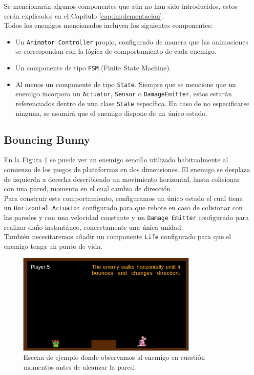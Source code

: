 Se mencionarán algunos componentes que aún no han sido introducidos, estos serán explicados en el Capítulo \ref{cap:implementacion}.\\


Todos los enemigos mencionados incluyen los siguientes componentes:

\begin{itemize}
\item Un \texttt{Animator Controller} propio, configurado de manera que las animaciones se correspondan con la lógica de comportamiento de cada enemigo.
\item Un componente de tipo \texttt{FSM} (Finite State Machine).
\item Al menos un componente de tipo \texttt{State}. Siempre que se mencione que un enemigo incorpora un \texttt{Actuator}, \texttt{Sensor} o \texttt{DamageEmitter}, estos estarán referenciados dentro de una clase \texttt{State} específica. En caso de no especificarse ninguna, se asumirá que el enemigo dispone de un único estado.
\end{itemize}

\subsection{Bouncing Bunny}

En la Figura \ref{fig:BouncingBunny} se puede ver un enemigo sencillo utilizado habitualmente al comienzo de los juegos de plataformas en dos dimensiones. El enemigo se desplaza de izquierda a derecha describiendo un movimiento horizontal, hasta colisionar con una pared, momento en el cual cambia de dirección.\\

Para construir este comportamiento, configuramos un único estado el cual tiene un \texttt{Horizontal Actuator} configurado para que rebote en caso de colisionar con las paredes y con una velocidad constante y un \texttt{Damage Emitter} configurado para realizar daño instantáneo, concretamente una única unidad.\\

También necesitaremos añadir un componente \texttt{Life} configurado para que el enemigo tenga un punto de vida.

\begin{figure}[t]
	\centering
	\includegraphics[height=5cm]{Imagenes/BouncingBunny.png}
	\caption{Escena de ejemplo donde observamos al enemigo en cuestión momentos antes de alcanzar la pared.}
	\label{fig:BouncingBunny}
\end{figure}

